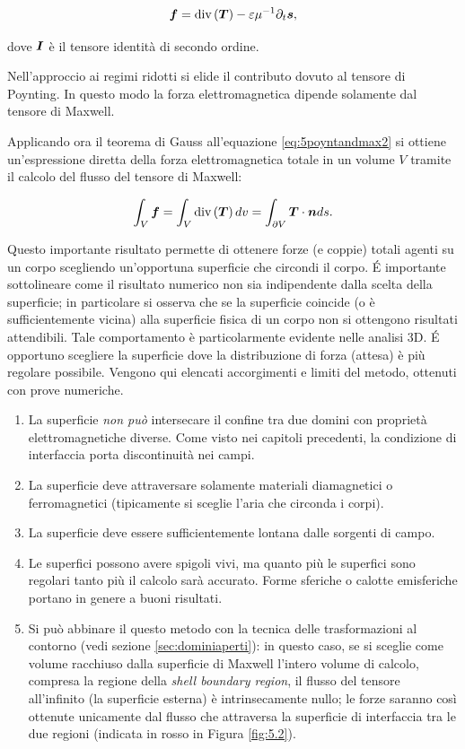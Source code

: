 \begin{equation}
\label{eq:5poyntandmax2}
\boldsymbol{f} = \text{div}\left(\boldsymbol{T}\right) -\varepsilon\mu^{-1} \partial_t\boldsymbol{s},
\end{equation}

dove $\boldsymbol{I}$ è il tensore identità di secondo ordine. 

Nell'approccio ai regimi ridotti si elide il contributo dovuto al tensore di Poynting. In questo modo la forza elettromagnetica dipende solamente dal tensore di Maxwell.

Applicando ora il teorema di Gauss all'equazione \eqref{eq:5poyntandmax2} si ottiene un'espressione diretta della forza elettromagnetica totale in un volume $V$ tramite il calcolo del flusso del tensore di Maxwell:

\begin{equation}
\label{eq:5maxf6}
\int_V\boldsymbol{f} = \int_V\text{div}\left(\boldsymbol{T}\right)dv = \int_{\partial V}\boldsymbol{T}\cdot \boldsymbol{n}ds.
\end{equation}

Questo importante risultato permette di ottenere forze (e coppie) totali agenti su un corpo scegliendo un'opportuna superficie che circondi il corpo. \'E importante sottolineare come il risultato numerico non sia indipendente dalla scelta della superficie; in particolare si osserva che se la superficie coincide (o è sufficientemente vicina) alla superficie fisica di un corpo non si ottengono risultati attendibili. Tale comportamento è particolarmente evidente nelle analisi 3D. \'E opportuno scegliere la superficie dove la distribuzione di forza (attesa) è più regolare possibile. 
Vengono qui elencati accorgimenti e limiti del metodo, ottenuti con prove numeriche.
\begin{enumerate}
\item La superficie \textit{non può} intersecare il confine tra due domini con proprietà elettromagnetiche diverse. Come visto nei capitoli precedenti, la condizione di interfaccia porta discontinuità nei campi.
\item  La superficie deve attraversare solamente materiali diamagnetici o ferromagnetici (tipicamente si sceglie l'aria che circonda i corpi).
\item La superficie deve essere sufficientemente lontana dalle sorgenti di campo.
\item Le superfici possono avere spigoli vivi, ma quanto più le superfici sono regolari tanto più il calcolo sarà accurato. Forme sferiche o calotte emisferiche portano in genere a buoni risultati.
\item Si può abbinare il questo metodo con la tecnica delle trasformazioni al contorno (vedi sezione \ref{sec:dominiaperti}): in questo caso, se si sceglie come volume racchiuso dalla superficie di Maxwell l'intero volume di calcolo, compresa la regione della \textit{shell boundary region}, il flusso del tensore all'infinito (la superficie esterna) è intrinsecamente nullo; le forze saranno così ottenute unicamente dal flusso che attraversa la superficie di interfaccia tra le due regioni (indicata in rosso in Figura \ref{fig:5.2}).
\end{enumerate}

